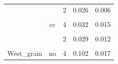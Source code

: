 \documentclass[
]{article}
\begin{document}
\begin{table}[H]
\begin{tabular}[t]{ccccc}
 &  & 2 & 0.026 & 0.006\\

\cellcolor{gray!6}{} & \cellcolor{gray!6}{} & \cellcolor{gray!6}{3} & \cellcolor{gray!6}{0.039} & \cellcolor{gray!6}{0.016}\\

 & \multirow{-4}{*}{\centering\arraybackslash cc} & 4 & 0.032 & 0.015\\

\cellcolor{gray!6}{} & \cellcolor{gray!6}{} & \cellcolor{gray!6}{1} & \cellcolor{gray!6}{0.013} & \cellcolor{gray!6}{0.013}\\

 &  & 2 & 0.029 & 0.012\\

\cellcolor{gray!6}{} & \cellcolor{gray!6}{} & \cellcolor{gray!6}{3} & \cellcolor{gray!6}{0.051} & \cellcolor{gray!6}{0.017}\\

\multirow{-8}{*}{\centering\arraybackslash West\_grain} & \multirow{-4}{*}{\centering\arraybackslash no} & 4 & 0.102 & 0.017\\
\bottomrule
\end{tabular}
\end{table}
\end{document}
